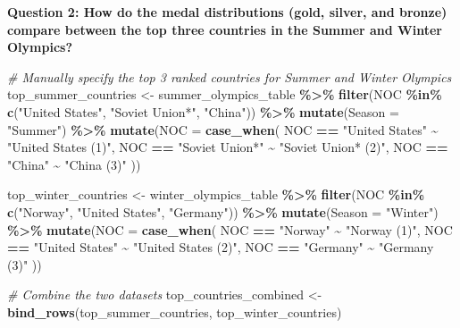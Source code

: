 \documentclass[
]{article}
\newenvironment{Shaded}{\begin{snugshade}}{\end{snugshade}}
\newcommand{\AttributeTok}[1]{\textcolor[rgb]{0.13,0.29,0.53}{#1}}
\newcommand{\CommentTok}[1]{\textcolor[rgb]{0.56,0.35,0.01}{\textit{#1}}}
\newcommand{\FunctionTok}[1]{\textcolor[rgb]{0.13,0.29,0.53}{\textbf{#1}}}
\newcommand{\NormalTok}[1]{#1}
\newcommand{\OtherTok}[1]{\textcolor[rgb]{0.56,0.35,0.01}{#1}}
\newcommand{\SpecialCharTok}[1]{\textcolor[rgb]{0.81,0.36,0.00}{\textbf{#1}}}
\newcommand{\StringTok}[1]{\textcolor[rgb]{0.31,0.60,0.02}{#1}}
\begin{document}
\textbf{Question 2: How do the medal distributions (gold, silver, and
bronze) compare between the top three countries in the Summer and Winter
Olympics?}

\begin{Shaded}
\begin{Highlighting}[]
\CommentTok{\# Manually specify the top 3 ranked countries for Summer and Winter Olympics}
\NormalTok{top\_summer\_countries }\OtherTok{\textless{}{-}}\NormalTok{ summer\_olympics\_table }\SpecialCharTok{\%\textgreater{}\%}
  \FunctionTok{filter}\NormalTok{(NOC }\SpecialCharTok{\%in\%} \FunctionTok{c}\NormalTok{(}\StringTok{"United States"}\NormalTok{, }\StringTok{"Soviet Union*"}\NormalTok{, }\StringTok{"China"}\NormalTok{)) }\SpecialCharTok{\%\textgreater{}\%}
  \FunctionTok{mutate}\NormalTok{(}\AttributeTok{Season =} \StringTok{"Summer"}\NormalTok{) }\SpecialCharTok{\%\textgreater{}\%}
  \FunctionTok{mutate}\NormalTok{(}\AttributeTok{NOC =} \FunctionTok{case\_when}\NormalTok{(}
\NormalTok{    NOC }\SpecialCharTok{==} \StringTok{"United States"} \SpecialCharTok{\textasciitilde{}} \StringTok{"United States (1)"}\NormalTok{,}
\NormalTok{    NOC }\SpecialCharTok{==} \StringTok{"Soviet Union*"} \SpecialCharTok{\textasciitilde{}} \StringTok{"Soviet Union* (2)"}\NormalTok{,}
\NormalTok{    NOC }\SpecialCharTok{==} \StringTok{"China"} \SpecialCharTok{\textasciitilde{}} \StringTok{"China (3)"}
\NormalTok{  ))}

\NormalTok{top\_winter\_countries }\OtherTok{\textless{}{-}}\NormalTok{ winter\_olympics\_table }\SpecialCharTok{\%\textgreater{}\%}
  \FunctionTok{filter}\NormalTok{(NOC }\SpecialCharTok{\%in\%} \FunctionTok{c}\NormalTok{(}\StringTok{"Norway"}\NormalTok{, }\StringTok{"United States"}\NormalTok{, }\StringTok{"Germany"}\NormalTok{)) }\SpecialCharTok{\%\textgreater{}\%}
  \FunctionTok{mutate}\NormalTok{(}\AttributeTok{Season =} \StringTok{"Winter"}\NormalTok{) }\SpecialCharTok{\%\textgreater{}\%}
  \FunctionTok{mutate}\NormalTok{(}\AttributeTok{NOC =} \FunctionTok{case\_when}\NormalTok{(}
\NormalTok{    NOC }\SpecialCharTok{==} \StringTok{"Norway"} \SpecialCharTok{\textasciitilde{}} \StringTok{"Norway (1)"}\NormalTok{,}
\NormalTok{    NOC }\SpecialCharTok{==} \StringTok{"United States"} \SpecialCharTok{\textasciitilde{}} \StringTok{"United States (2)"}\NormalTok{,}
\NormalTok{    NOC }\SpecialCharTok{==} \StringTok{"Germany"} \SpecialCharTok{\textasciitilde{}} \StringTok{"Germany (3)"}
\NormalTok{  ))}

\CommentTok{\# Combine the two datasets}
\NormalTok{top\_countries\_combined }\OtherTok{\textless{}{-}} \FunctionTok{bind\_rows}\NormalTok{(top\_summer\_countries, top\_winter\_countries)}


\end{Highlighting}
\end{Shaded}
\end{document}
